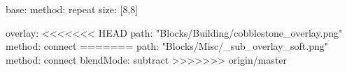 base:
  method: repeat
  size: [8,8]

overlay:
<<<<<<< HEAD
  path: "Blocks/Building/cobblestone_overlay.png"
  method: connect
=======
  path: "Blocks/Misc/_sub_overlay_soft.png"
  method: connect
  blendMode: subtract
>>>>>>> origin/master
